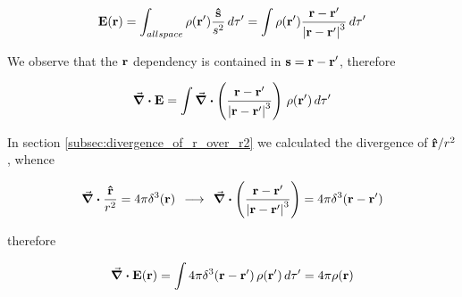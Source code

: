 \begin{equation}
\vb{E}(\vb{r}) = \int_{all space} \rho(\vb{r}') \frac{\vu{s}}{s^2} \,d\tau' = \int \rho(\vb{r}') \frac{\vb{r} - \vb{r}'}{\abs{\vb{r} - \vb{r}'}^3} \,d\tau'
\end{equation}

We observe that the $\vb{r}$ dependency is contained in $\vb{s} = \vb{r} - \vb{r}'$, therefore 

$$\div{\vb{E}} = \int \div{ \left( \frac{\vb{r} - \vb{r}'}{\abs{\vb{r} - \vb{r}'}^3} \right)}\, \rho(\vb{r}') \,d\tau'$$   

In section \ref{subsec:divergence_of_r_over_r2} we calculated the divergence of $\vu{r}/r^2$, whence

$$\div{\frac{\vu{r}}{r^2}} = 4\pi \delta^3(\vb{r}) \:\: \longrightarrow \:\: \div{ \left( \frac{\vb{r} - \vb{r}'}{\abs{\vb{r} - \vb{r}'}^3} \right)} = 4\pi \delta^3(\vb{r} - \vb{r}')$$

therefore 

\begin{equation}
\div{\vb{E}(\vb{r})} = \int 4\pi \delta^3(\vb{r} - \vb{r}') \, \rho(\vb{r}') \,d\tau' = 4 \pi \rho(\vb{r})   
\end{equation}







